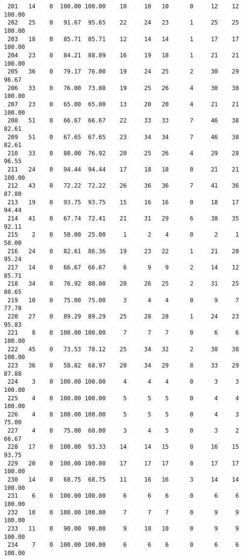 \begin{verbatim}
 201   14    0  100.00 100.00    10     10   10      0     12    12   100.00
 202   25    0   91.67  95.65    22     24   23      1     25    25   100.00
 203   18    0   85.71  85.71    12     14   14      1     17    17   100.00
 204   23    0   84.21  88.89    16     19   18      1     21    21   100.00
 205   36    0   79.17  76.00    19     24   25      2     30    29    96.67
 206   33    0   76.00  73.08    19     25   26      4     30    30   100.00
 207   23    0   65.00  65.00    13     20   20      4     21    21   100.00
 208   51    0   66.67  66.67    22     33   33      7     46    38    82.61
 209   51    0   67.65  67.65    23     34   34      7     46    38    82.61
 210   33    0   80.00  76.92    20     25   26      4     29    28    96.55
 211   24    0   94.44  94.44    17     18   18      0     21    21   100.00
 212   43    0   72.22  72.22    26     36   36      7     41    36    87.80
 213   19    0   93.75  93.75    15     16   16      0     18    17    94.44
 214   41    0   67.74  72.41    21     31   29      6     38    35    92.11
 215    2    0   50.00  25.00     1      2    4      0      2     1    50.00
 216   24    0   82.61  86.36    19     23   22      1     21    20    95.24
 217   14    0   66.67  66.67     6      9    9      2     14    12    85.71
 218   34    0   76.92  80.00    20     26   25      2     31    25    80.65
 219   10    0   75.00  75.00     3      4    4      0      9     7    77.78
 220   27    0   89.29  89.29    25     28   28      1     24    23    95.83
 221    8    0  100.00 100.00     7      7    7      0      6     6   100.00
 222   45    0   73.53  78.12    25     34   32      2     38    38   100.00
 223   36    0   58.82  68.97    20     34   29      8     33    29    87.88
 224    3    0  100.00 100.00     4      4    4      0      3     3   100.00
 225    4    0  100.00 100.00     5      5    5      0      4     4   100.00
 226    4    0  100.00 100.00     5      5    5      0      4     3    75.00
 227    4    0   75.00  60.00     3      4    5      0      3     2    66.67
 228   17    0  100.00  93.33    14     14   15      0     16    15    93.75
 229   20    0  100.00 100.00    17     17   17      0     17    17   100.00
 230   14    0   68.75  68.75    11     16   16      3     14    14   100.00
 231    6    0  100.00 100.00     6      6    6      0      6     6   100.00
 232   10    0  100.00 100.00     7      7    7      0      9     9   100.00
 233   11    0   90.00  90.00     9     10   10      0      9     9   100.00
 234    7    0  100.00 100.00     6      6    6      0      6     6   100.00

\end{verbatim}
